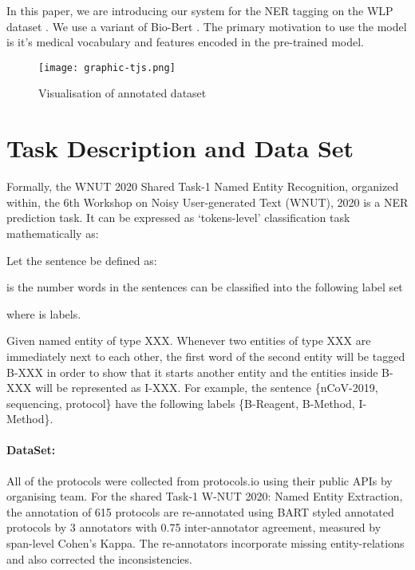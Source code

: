 \documentclass[11pt,a4paper]{article}
\begin{document}
In this paper, we are introducing our system for the NER tagging on the WLP dataset \citep{kulkarni2018wetlab}. We use a variant of Bio-Bert \citep{10.1093/bioinformatics/btz682}. The primary motivation to use the model is it's medical vocabulary and features encoded in the pre-trained model.

\begin{figure*}
\centering
   \texttt{[image: graphic-tjs.png]}
\caption{Visualisation of annotated dataset \footnotemark}
\label{data-formate}
\end{figure*}



\section{Task Description and Data Set}

Formally, the WNUT 2020 Shared Task-1 Named Entity Recognition, organized within, the 6th Workshop on Noisy User-generated Text (WNUT), 2020 \cite{tabassum2020wlp} is a NER prediction task. It can be expressed as `tokens-level' classification task mathematically as:

Let the sentence  be defined as:



 is the number words in the sentences can be classified into the following label set 



where  is labels.

Given named entity of type XXX. Whenever two entities of
type XXX are immediately next to each other, the
first word of the second entity will be tagged B-XXX
in order to show that it starts another entity and the entities inside B-XXX will be represented as I-XXX. For example, the sentence  \{nCoV-2019, sequencing, protocol\} have the following labels \{B-Reagent, B-Method, I-Method\}.





\paragraph{DataSet:}  All of the protocols \cite{kulkarni2018wetlab} were collected from protocols.io using their public APIs by organising team. For the shared Task-1 W-NUT 2020: Named Entity Extraction, the annotation of 615 protocols are re-annotated using BART styled annotated protocols by 3 annotators with 0.75 inter-annotator agreement, measured by span-level Cohen's Kappa. The re-annotators incorporate missing entity-relations and also corrected the inconsistencies.
\end{document}
